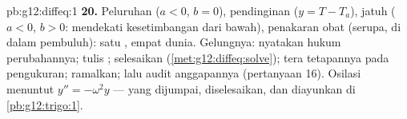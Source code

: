 \begin{solution}{pb:g12:diffeq:1}
\textbf{20.} Peluruhan ($a < 0$, $b = 0$), pendinginan ($y = T - T_a$),
jatuh ($a < 0$, $b > 0$: mendekati kesetimbangan dari
bawah), penakaran obat (serupa, di dalam pembuluh): satu , empat dunia.
Gelungnya: nyatakan hukum perubahannya; tulis ; selesaikan
(\cref{met:g12:diffeq:solve}); tera tetapannya pada
pengukuran; ramalkan; lalu audit anggapannya (pertanyaan
16). Osilasi menuntut $y'' = -\omega^2 y$ --- yang dijumpai, diselesaikan, dan
diayunkan di \cref{pb:g12:trigo:1}.

\end{solution}
